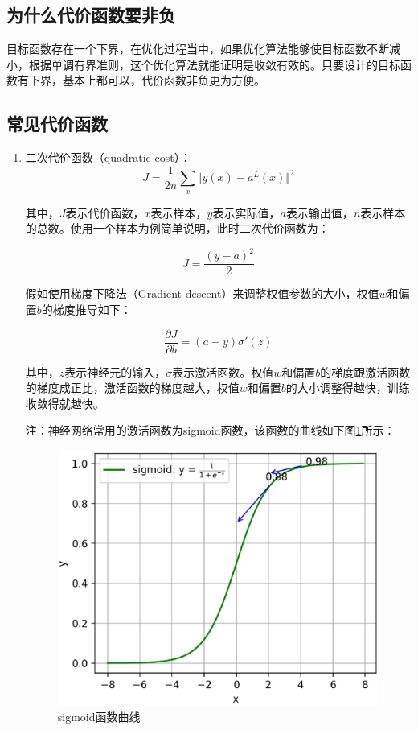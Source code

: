 \subsection{ 为什么代价函数要非负}

目标函数存在一个下界，在优化过程当中，如果优化算法能够使目标函数不断减小，根据单调有界准则，这个优化算法就能证明是收敛有效的。只要设计的目标函数有下界，基本上都可以，代价函数非负更为方便。

\subsection{常见代价函数}

\begin{enumerate}
			\itemsep0em 
	\item 二次代价函数（quadratic cost）：
$$
J = \frac{1}{2n}\sum_x\Vert y(x)-a^L(x)\Vert^2
$$

其中，$J$表示代价函数，$x$表示样本，$y$表示实际值，$a$表示输出值，$n$表示样本的总数。使用一个样本为例简单说明，此时二次代价函数为：

$$
J = \frac{(y-a)^2}{2}
$$

假如使用梯度下降法（Gradient descent）来调整权值参数的大小，权值$w$和偏置$b$的梯度推导如下：

$$
\frac{\partial J}{\partial b}=(a-y)\sigma'(z)
$$

其中，$z$表示神经元的输入，$\sigma$表示激活函数。权值$w$和偏置$b$的梯度跟激活函数的梯度成正比，激活函数的梯度越大，权值$w$和偏置$b$的大小调整得越快，训练收敛得就越快。

		注：神经网络常用的激活函数为sigmoid函数，该函数的曲线如下图\ref{fig:2.8}所示：

 \begin{figure}[h]
   \centering
   \includegraphics[width=.7\textwidth]{imgs/2.18.1.eps}
   \caption{sigmoid函数曲线}
   \label{fig:2.8}
 \end{figure}


\end{enumerate}
